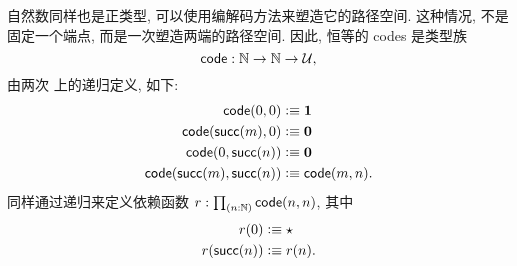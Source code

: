 %
%
自然数同样也是正类型, 可以使用编解码方法来塑造它的路径空间.
这种情况, 不是固定一个端点, 而是一次塑造两端的路径空间.
因此, 恒等的 codes 是类型族
\[\mathsf{code}:\mathbb{N}\to\mathbb{N}\to\mathcal{U},\]
由两次 \N 上的递归定义, 如下:
\begin{align*}
  \mathsf{code}(0,0) &\vcentcolon\equiv \mathbf{1}\\
  \mathsf{code}(\mathsf{succ}(m),0) &\vcentcolon\equiv \mathbf{0}\\
  \mathsf{code}(0,\mathsf{succ}(n)) &\vcentcolon\equiv \mathbf{0}\\
  \mathsf{code}(\mathsf{succ}(m),\mathsf{succ}(n)) &\vcentcolon\equiv \mathsf{code}(m,n).
\end{align*}
同样通过递归来定义依赖函数 $r:\prd{n:\N} \code(n,n)$, 其中
\begin{align*}
  r(0) &\vcentcolon\equiv \star\\
  r(\mathsf{succ}(n)) &\vcentcolon\equiv r(n).
\end{align*}

